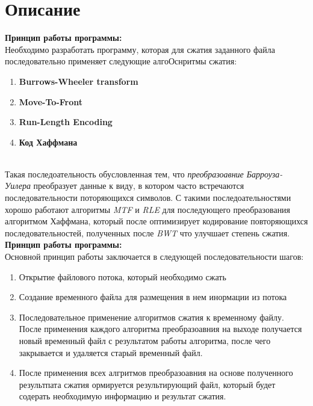 \section{Описание}

{\large\bfseries Принцип работы программы:} \\
Необходимо разработать программу, которая для сжатия заданного файла последовательно применяет следующие алгоОснритмы сжатия:
\begin{enumerate}
    \item {\bfseries  Burrows-Wheeler transform}
        
    \item {\bfseries Move-To-Front}
    
    \item {\bfseries Run-Length Encoding}
    
    \item {\bfseries Код Хаффмана}
    
\end{enumerate} \\

Такая последоательность обусловленная тем, что {\it преобразоавние Барроуза-Уилера} преобразует данные к виду, в котором часто встречаются последовательности поторяющихся символов. С такими последоательностями хорошо работают алгоритмы {\it MTF} и {\it RLE} для последующего преобразования {алгоритмом Хаффмана}, который после оптимизирует кодирование повторяющихся последовательностей, полученных после {\it BWT}  что улучшает степень сжатия. \cite{mtf} \\

{\large\bfseries Принцип работы программы:} \\
Основной принцип работы заключается в следующей последовательности шагов:
\begin{enumerate}
    \item Открытие файлового потока, который необходимо сжать
    \item Создание временного файла для размещения в нем инормации из потока
    \item Последовательное применение алгоритмов сжатия к временному файлу. После применения каждого алгоритма преобразоавния на выходе получается новый временный файл с результатом работы алгоритма, после чего закрывается и удаляется старый временный файл.
    \item После применения всех алгритмов преобразоавния на основе полученного результпата сжатия ормируется результирующий файл, который будет содерать необходимую информацию и результат сжатия.
\end{enumerate} \\

